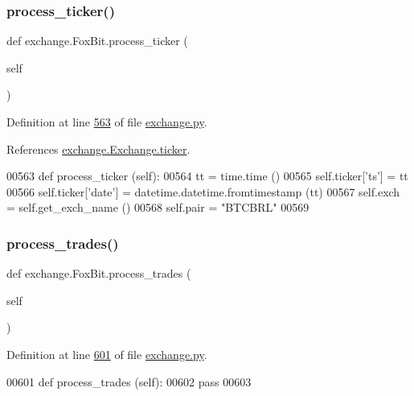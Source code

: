 \subsubsection{\texorpdfstring{process\+\_\+ticker()}{process\_ticker()}}
{\footnotesize\ttfamily def exchange.\+Fox\+Bit.\+process\+\_\+ticker (\begin{DoxyParamCaption}\item[{}]{self }\end{DoxyParamCaption})}



Definition at line \hyperlink{exchange_8py_source_l00563}{563} of file \hyperlink{exchange_8py_source}{exchange.\+py}.



References \hyperlink{exchange_8py_source_l00188}{exchange.\+Exchange.\+ticker}.


\begin{DoxyCode}
00563     \textcolor{keyword}{def }process\_ticker (self):
00564         tt = time.time ()
00565         self.ticker[\textcolor{stringliteral}{'ts'}] = tt
00566         self.ticker[\textcolor{stringliteral}{'date'}] = datetime.datetime.fromtimestamp (tt)
00567         self.exch = self.get\_exch\_name ()
00568         self.pair = \textcolor{stringliteral}{"BTCBRL"}
00569      
\end{DoxyCode}
\mbox{\label{classexchange_1_1_fox_bit_a244f81e91b04a1118d2d17f6c8497cb5}} 
\subsubsection{\texorpdfstring{process\+\_\+trades()}{process\_trades()}}
{\footnotesize\ttfamily def exchange.\+Fox\+Bit.\+process\+\_\+trades (\begin{DoxyParamCaption}\item[{}]{self }\end{DoxyParamCaption})}



Definition at line \hyperlink{exchange_8py_source_l00601}{601} of file \hyperlink{exchange_8py_source}{exchange.\+py}.


\begin{DoxyCode}
00601     \textcolor{keyword}{def }process\_trades (self):
00602         \textcolor{keywordflow}{pass}
00603      
\end{DoxyCode}



